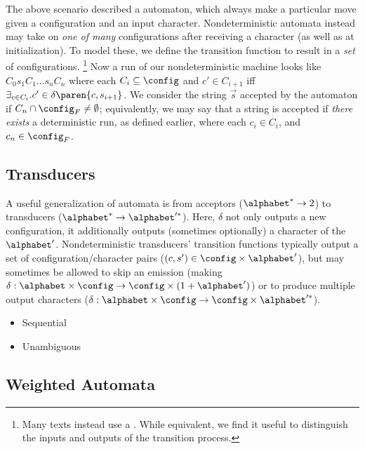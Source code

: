The above scenario described a  automaton, which always
make a particular move given a configuration and an input character.
Nondeterministic automata instead may take on {\em one of many}
configurations after receiving a character (as well as at initialization).
To model these, we define the transition function to result in a {\em set}
of configurations.%
%
\footnote{Many texts instead use a .  While
equivalent, we find it useful to distinguish the inputs and outputs of the
transition process.}
%
Now a run of our nondeterministic machine looks like $C_0 s_1 C_1 \ldots s_n
C_n$ where each $C_i \subseteq \config$ and $c' \in C_{i+1}$ iff $\exists_{c
\in C_i} . c' \in \delta\paren{c,s_{i+1}}$.  We consider the string
$\vec{s}$ accepted by the automaton if $C_n \cap \config_F \ne \emptyset$;
equivalently, we may say that a string is accepted if {\em there exists} a
deterministic run, as defined earlier, where each $c_i \in C_i$, and $c_n
\in \config_F$.

\subsection{Transducers}

A useful generalization of automata is from acceptors ($\alphabet^* \to 2$) to
transducers ($\alphabet^* \to \alphabet'^*$).  Here, $\delta$ not only outputs a
new configuration, it additionally outputs (sometimes optionally) a
character of the  $\alphabet'$.  Nondeterministic
transducers' transition functions typically output a set of
configuration/character pairs ($(c, s') \in \config \times \alphabet'$), but
may sometimes be allowed to skip an emission (making $\delta : \alphabet \times
\config \to \config \times (1+\alphabet')$) or to produce multiple output
characters (\eg $\delta : \alphabet \times \config \to \config \times
\alphabet'^*$).

\begin{itemize}
  \item Sequential
  \item Unambiguous
\end{itemize}

\subsection{Weighted Automata}

